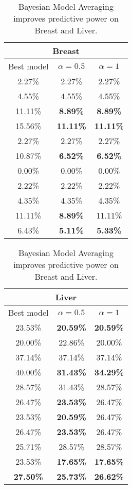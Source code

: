 \begin{table} [!b]

\caption{{ Bayesian Model Averaging improves predictive power on Breast and Liver.  }}

\label{tbl:BMAliver}

\begin{minipage}{0.5\textwidth}
      \centering
           \begin{tabular}{|c | c | c | }
      \hline
      \multicolumn{3}{|c|}{Breast}  \\
      \hline
      Best model & $ \alpha = 0.5 $ & $ \alpha = 1 $ \\  \hline
2.27\% & 	2.27\% & 	2.27\% \\
4.55\% & 	4.55\% & 	4.55\% \\
11.11\% & 	\textbf{8.89\% } & 	\textbf{8.89\%} \\ 
15.56\% & 	\textbf{11.11\% } & 	\textbf{11.11\%} \\ 
2.27\% & 	2.27\% & 	2.27\% \\ 
10.87\% & 	\textbf{6.52\% } & 	\textbf{6.52\%} \\ 
0.00\% & 	0.00\% & 	0.00\% \\ 
2.22\% & 	2.22\% & 	2.22\% \\ 
4.35\% & 	4.35\% & 	4.35\% \\ 
11.11\% & 	\textbf{8.89\%} & 	11.11\% \\  \hline  
 6.43\%	&  \textbf{5.11\%}	&  \textbf{5.33\%} \\
       \hline 
 
 \end{tabular}

\end{minipage}%
\begin{minipage}{0.5\textwidth}
      \centering
      \begin{tabular}{|c | c | c | }
      \hline
      \multicolumn{3}{|c|}{Liver}  \\
      \hline
      Best model & $ \alpha = 0.5 $ & $ \alpha = 1 $ \\  \hline
      23.53\% & \textbf{20.59\%} & \textbf{20.59\% } \\ 
      20.00\%	& 22.86\% &20.00\% \\ 
      37.14\%	& 37.14\% &37.14\%\\ 
      40.00\%	& \textbf{31.43\%} & \textbf{34.29\%}  \\ 
      28.57\%	& 31.43\% & 28.57\% \\ 
      26.47\%	& \textbf{23.53\%} & 26.47\% \\ 
      23.53\%	& \textbf{20.59\%} &26.47\%\\ 
      26.47\%	& \textbf{23.53\%} &26.47\%\\ 
      25.71\%	& 28.57\% &28.57\% \\ 
      23.53\%	& \textbf{17.65\%} & \textbf{17.65\%} \\ \hline 
       \textbf{27.50\%}	&  \textbf{25.73\%} &  \textbf{26.62\%} \\ 
      \hline 
      \end{tabular}

\end{minipage}%
\end{table}
